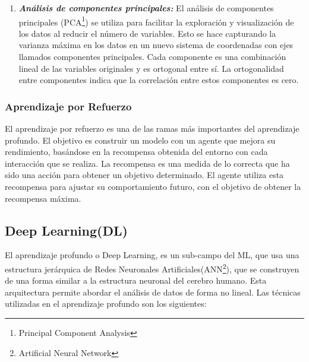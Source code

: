 \begin{enumerate}[label=\textbf{\arabic*})]
	\begin{enumerate}[label=\textbf{(\alph*)}]
		\item \textit{\textbf{Análisis de componentes principales:}}
		El análisis de componentes principales (PCA\footnote{Principal Component Analysis}) se utiliza para facilitar la exploración y visualización de los datos al reducir el número de variables. Esto se hace capturando la varianza máxima en los datos en un nuevo sistema de coordenadas con ejes llamados componentes principales. Cada componente es una combinación lineal de las variables originales y es ortogonal entre sí. La ortogonalidad entre componentes indica que la correlación entre estos componentes es cero\cite{Shaw2019}.
	\end{enumerate}
	
\end{enumerate}

\subsubsection{Aprendizaje por Refuerzo}

El aprendizaje por refuerzo es una de las ramas más importantes del aprendizaje profundo. El objetivo es construir un modelo con un agente que mejora su rendimiento, basándose en la recompensa obtenida del entorno con cada interacción que se realiza. La recompensa es una medida de lo correcta que ha sido una acción para obtener un objetivo determinado. El agente utiliza esta recompensa para ajustar su comportamiento futuro, con el objetivo de obtener la recompensa máxima\cite{BriegaLopez2015}. 

\subsection{Deep Learning(DL)}

El aprendizaje profundo o Deep Learning, es un sub-campo del ML, que usa una estructura jerárquica de Redes Neuronales Artificiales(ANN\footnote{Artificial Neural Network}), que se construyen de una forma similar a la estructura neuronal del cerebro humano. Esta arquitectura permite abordar el análisis de datos de forma no lineal\cite{BriegaLopez2015}.  Las técnicas utilizadas en el aprendizaje profundo son los siguientes:

